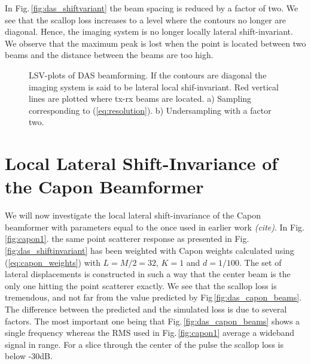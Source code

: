 \documentclass[journal]{IEEEtran}
\newcommand{\img}{img/}
\newcommand\comment[1]{\textit{{\color{red}(#1)}}}
\begin{document}
In Fig.\,\ref{fig:das_shiftvariant} the beam spacing is reduced by a factor of two. We see that the scallop loss increases to a level where the contours no longer are diagonal. Hence, the imaging system is no longer locally lateral shift-invariant. We observe that the maximum peak is lost when the point is located between two beams and the distance between the beams are too high.

\begin{figure*}[!t]
\centerline{
\hfill{}
}
\caption{LSV-plots of DAS beamforming. If the contours are diagonal the imaging system is said to be lateral local shif-invariant. Red vertical lines are plotted where tx-rx beams are located. a) Sampling corresponding to (\ref{eq:resolution}). b) Undersampling with a factor two.}
\label{fig:das}
\end{figure*}

\section{Local Lateral Shift-Invariance of the Capon Beamformer}
We will now investigate the local lateral shift-invariance of the Capon beamformer with parameters equal to the once used in earlier work \comment{cite}. In Fig.\,\ref{fig:capon1}. the same point scatterer response as presented in Fig.\,\ref{fig:das_shiftinvariant} has been weighted with Capon weights calculated using (\ref{eq:capon_weights}) with $L = M/2 = 32$, $K=1$ and $d=1/100$. The set of lateral displacements is constructed in such a way that the center beam is the only one hitting the point scatterer exactly. We see that the scallop loss is tremendous, and not far from the value predicted by Fig\,\ref{fig:das_capon_beams}. The difference between the predicted and the simulated loss is due to several factors. The most important one being that Fig.\,\ref{fig:das_capon_beams} shows a single frequency whereas the RMS used in Fig.\,\ref{fig:capon1} average a wideband signal in range. For a slice through the center of the pulse the scallop loss is below -30dB.
\end{document}
